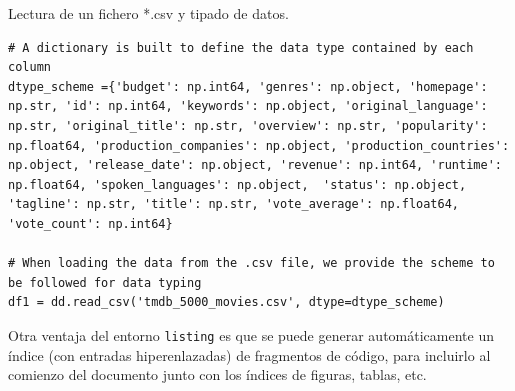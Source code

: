 \documentclass[a4paper, 12pt]{book}
\begin{document}

\begin{listing}[h!]
    \caption{Lectura de un fichero *.csv y tipado de datos.}{}
    \label{lst:1}
    \begin{verbatim}
# A dictionary is built to define the data type contained by each column
dtype_scheme ={'budget': np.int64, 'genres': np.object, 'homepage': np.str, 'id': np.int64, 'keywords': np.object, 'original_language': np.str, 'original_title': np.str, 'overview': np.str, 'popularity': np.float64, 'production_companies': np.object, 'production_countries': np.object, 'release_date': np.object, 'revenue': np.int64, 'runtime': np.float64, 'spoken_languages': np.object,  'status': np.object, 'tagline': np.str, 'title': np.str, 'vote_average': np.float64, 'vote_count': np.int64}

# When loading the data from the .csv file, we provide the scheme to be followed for data typing
df1 = dd.read_csv('tmdb_5000_movies.csv', dtype=dtype_scheme)
    \end{verbatim}
\end{listing}

Otra ventaja del entorno \verb|listing| es que se puede generar automáticamente un índice
(con entradas hiperenlazadas) de fragmentos de código, para incluirlo al comienzo del 
documento junto con los índices de figuras, tablas, etc.
\end{document}
